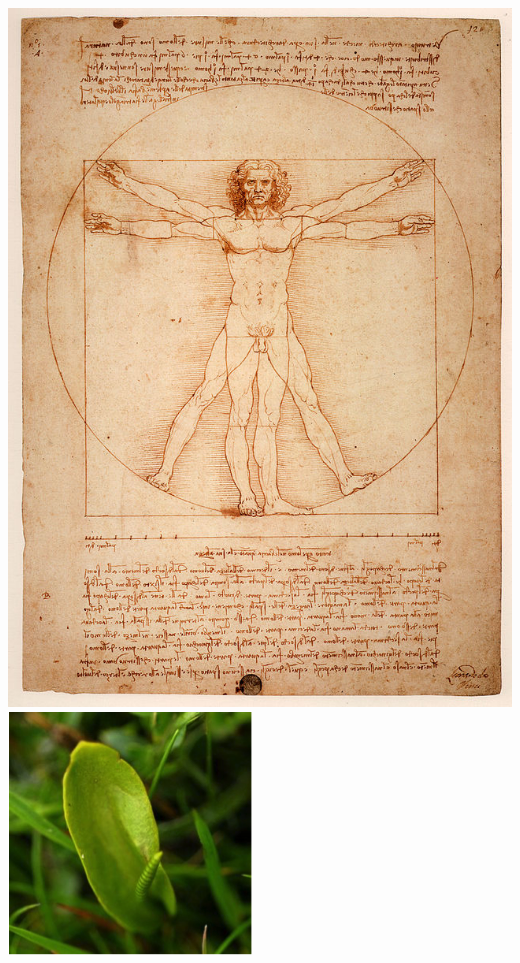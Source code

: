 \begin{frame}
\begin{center}
    \includegraphics[height=0.15\textheight]{images/640px-Uomo_Vitruviano}
    \includegraphics[height=0.15\textheight]{images/adders_tongue}

\end{center}
\end{frame}
